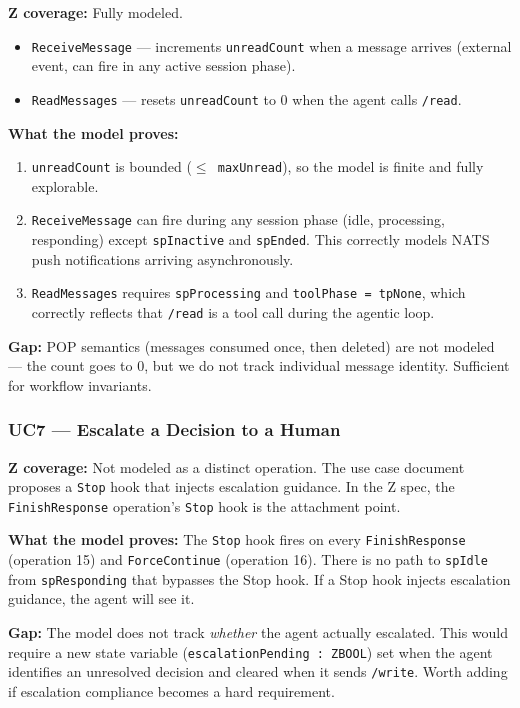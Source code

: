 \documentclass[a4paper,10pt,fleqn]{article}
\begin{document}
\textbf{Z coverage:} Fully modeled.

\begin{itemize}
  \item \texttt{ReceiveMessage} --- increments \texttt{unreadCount} when
    a message arrives (external event, can fire in any active session phase).
  \item \texttt{ReadMessages} --- resets \texttt{unreadCount} to 0 when
    the agent calls \texttt{/read}.
\end{itemize}

\textbf{What the model proves:}

\begin{enumerate}
  \item \texttt{unreadCount} is bounded (\texttt{$\leq$ maxUnread}), so
    the model is finite and fully explorable.
  \item \texttt{ReceiveMessage} can fire during any session phase
    (idle, processing, responding) except \texttt{spInactive} and
    \texttt{spEnded}. This correctly models NATS push notifications
    arriving asynchronously.
  \item \texttt{ReadMessages} requires \texttt{spProcessing} and
    \texttt{toolPhase = tpNone}, which correctly reflects that \texttt{/read}
    is a tool call during the agentic loop.
\end{enumerate}

\textbf{Gap:} POP semantics (messages consumed once, then deleted) are
not modeled --- the count goes to 0, but we do not track individual
message identity. Sufficient for workflow invariants.

\subsubsection{UC7 --- Escalate a Decision to a Human}

\textbf{Z coverage:} Not modeled as a distinct operation. The use case
document proposes a \texttt{Stop} hook that injects escalation guidance.
In the Z spec, the \texttt{FinishResponse} operation's \texttt{Stop}
hook is the attachment point.

\textbf{What the model proves:} The \texttt{Stop} hook fires on every
\texttt{FinishResponse} (operation 15) and \texttt{ForceContinue}
(operation 16). There is no path to \texttt{spIdle} from
\texttt{spResponding} that bypasses the Stop hook. If a Stop hook
injects escalation guidance, the agent will see it.

\textbf{Gap:} The model does not track \emph{whether} the agent actually
escalated. This would require a new state variable
(\texttt{escalationPending : ZBOOL}) set when the agent identifies an
unresolved decision and cleared when it sends \texttt{/write}. Worth
adding if escalation compliance becomes a hard requirement.
\end{document}
